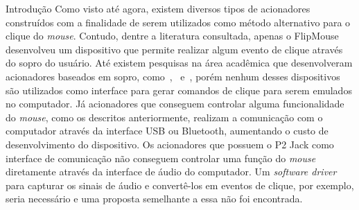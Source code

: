 \begin{chapter}{Introdução}
Como visto até agora, existem diversos tipos de acionadores construídos com a
finalidade de serem utilizados como método alternativo para o clique do
\textit{mouse}.  Contudo, dentre a literatura consultada, apenas o FlipMouse
desenvolveu um dispositivo que permite realizar algum evento de clique através
do sopro do usuário. Até existem pesquisas na área acadêmica que desenvolveram
acionadores baseados em sopro, como~\cite{Thaller13},~\cite{Mougharbel13}
e~\cite{Filho14}, porém nenhum desses dispositivos são utilizados como interface
para gerar comandos de clique para serem emulados no computador. Já acionadores
que conseguem controlar alguma funcionalidade do \textit{mouse}, 
como os descritos anteriormente,  realizam a comunicação com o computador 
através da interface USB ou Bluetooth, aumentando o custo de desenvolvimento do
dispositivo. Os acionadores que possuem o P2 Jack como interface de comunicação 
não conseguem controlar uma função do \textit{mouse} diretamente através da
interface de áudio do computador. Um \textit{software driver} para capturar os
sinais de áudio e convertê-los em eventos de clique, por exemplo, seria
necessário e uma proposta semelhante a essa não foi encontrada.    




\end{chapter}
